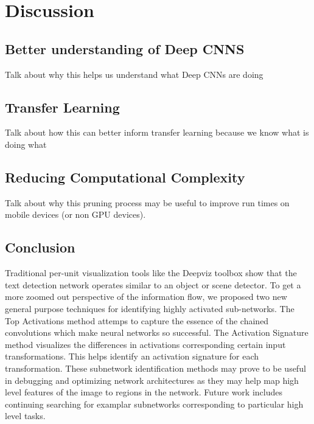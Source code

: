 \documentclass[10pt,twocolumn,letterpaper]{article}
\begin{document}
\section{Discussion}

\subsection{Better understanding of Deep CNNS}
Talk about why this helps us understand what Deep CNNs are doing

\subsection{Transfer Learning}

Talk about how this can better inform transfer learning because we know what is doing what

\subsection{Reducing Computational Complexity}
Talk about why this pruning process may be useful to improve run times on mobile devices (or non GPU devices).

\subsection{Conclusion}
Traditional per-unit visualization tools like the Deepviz toolbox \cite{} show that the text detection network operates similar to an object or scene detector. To get a more zoomed out perspective of the information flow, we proposed two new general purpose techniques for identifying highly activated sub-networks. The Top Activations method attemps to capture the essence of the chained convolutions which make neural networks so successful. The Activation Signature method visualizes the differences in activations corresponding certain input transformations. This helps identify an activation signature for each transformation. These subnetwork identification methods may prove to be useful in debugging and optimizing network architectures as they may help map high level features of the image to regions in the network. Future work includes continuing searching for examplar subnetworks corresponding to particular high level tasks.


{\small


}
\end{document}
